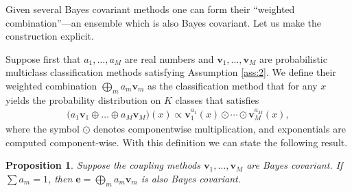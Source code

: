 \documentclass[pdflatex, sn-basic]{sn-jnl}%
\newtheorem{prop}{Proposition}
\theoremstyle{thmstyleone}%
\theoremstyle{thmstyletwo}%
\theoremstyle{thmstylethree}%
\begin{document}
Given several Bayes covariant methods one can form  their ``weighted combination''---an ensemble which is also Bayes covariant. Let us make the construction explicit.

Suppose first that $a_1, \ldots,a_M$ are real numbers and $\boldsymbol{v}_1, \ldots, \boldsymbol{v}_M$ are probabilistic multiclass classification methods satisfying Assumption \ref{ass:2}. We define their weighted combination $\bigoplus_m a_m \boldsymbol{v}_m$ as the classification method that for any $x$ yields the probability distribution on $K$ classes that satisfies
\begin{align*}
 	\bigl(a_1 \boldsymbol{v}_1 \oplus \ldots \oplus a_M \boldsymbol{v}_M\bigr)(x) \propto \boldsymbol{v}_1^{a_1}(x) \odot \cdots \odot \boldsymbol{v}_M^{a_M}(x),
\end{align*}
where the symbol $\odot$ denotes componentwise multiplication, and exponentials are computed component-wise. With this definition we can state the following result.

\begin{prop}
	\label{prop:ensemble}
Suppose the coupling methods $\boldsymbol{v}_1, \ldots, \boldsymbol{v}_M$ are Bayes covariant. If $\sum a_m = 1$, then $\boldsymbol{e} = \bigoplus_m a_m \boldsymbol{v}_m$ is also Bayes covariant.
\end{prop}
\end{document}
